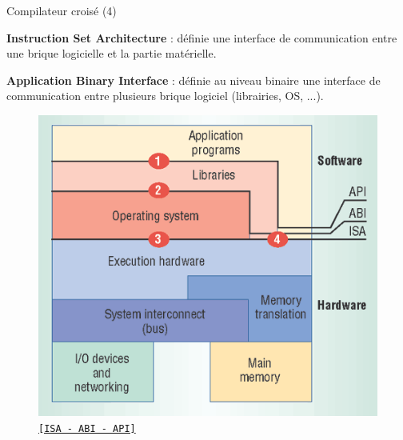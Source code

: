\documentclass[12pt, t]{beamer}
\newcommand{\src}[2]{\vspace{-10pt}\caption{\href{#1}{\centering \tt \tiny [#2]}}}
\begin{document}
\begin{frame}{Compilateur croisé (4)}

    \vspace{5pt}
    {\textbf{Instruction Set Architecture}} : définie une interface de
    communication entre une brique logicielle et la partie matérielle.

    {
        \vspace{5pt}
        {\textbf{Application Binary Interface}} : définie au niveau binaire une
        interface de communication entre plusieurs brique logiciel (librairies,
        OS, ...).
    }

    {
        \begin{figure}
            \centering
            \includegraphics[scale=0.45]{abi-isa.png}
            \src{http://www.computer.org/csdl/mags/co/2005/05/r5032-abs.html}{ISA - ABI - API}
        \end{figure}
    }
\end{frame}
\end{document}
